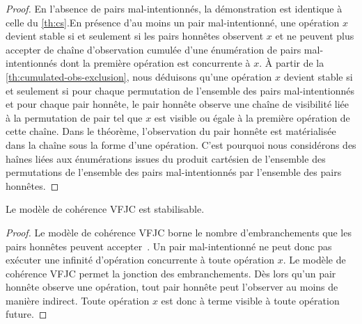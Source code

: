 \begin{proof}
En l'absence de pairs mal-intentionnés, la démonstration est identique à celle du \autoref{th:cs}.En présence d'au moins un pair mal-intentionné, une opération $x$ devient stable si et seulement si les pairs honnêtes observent $x$ et ne peuvent plus accepter de chaîne d'observation cumulée d'une énumération de pairs mal-intentionnés dont la première opération est concurrente à $x$.
À partir de la \autoref{th:cumulated-obs-exclusion}, nous déduisons qu'une opération $x$ devient stable si et seulement si pour chaque permutation de l'ensemble des pairs mal-intentionnés et pour chaque pair honnête, le pair honnête observe une chaîne de visibilité liée à la permutation de pair tel que $x$ est visible ou égale à la première opération de cette chaîne.
Dans le théorème, l'observation du pair honnête est matérialisée dans la chaîne sous la forme d'une opération.
C'est pourquoi nous considérons des haînes liées aux énumérations issues du produit cartésien de l'ensemble des permutations de l'ensemble des pairs mal-intentionnés par l'ensemble des pairs honnêtes.
\end{proof}




\begin{theorem}\label{th:stabilizable-vfjc}
Le modèle de cohérence \ac{VFJC} est stabilisable.
\end{theorem}

\begin{proof}
Le modèle de cohérence \ac{VFJC} borne le nombre d'embranchements que les pairs honnêtes peuvent accepter~\autocite{mahajan_2011_cac}.
Un pair mal-intentionné ne peut donc pas exécuter une infinité d'opération concurrente à toute opération $x$.
Le modèle de cohérence \ac{VFJC} permet la jonction des embranchements.
Dès lors qu'un pair honnête observe une opération, tout pair honnête peut l'observer au moins de manière indirect.
Toute opération $x$ est donc à terme visible à toute opération future.
\end{proof}

